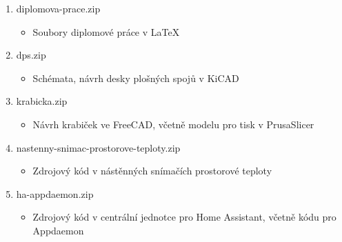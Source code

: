 \begin{enumerate}
  \item diplomova-prace.zip
  \begin{itemize}
     	\item Soubory diplomové práce v \LaTeX
  	\end{itemize}
  \item dps.zip 
  	\begin{itemize}
     	\item Schémata, návrh desky plošných spojů v KiCAD
  	\end{itemize}
  \item krabicka.zip
  	\begin{itemize}
     	\item Návrh krabiček ve FreeCAD, včetně modelu pro tisk v PrusaSlicer 
   	\end{itemize}
   \item nastenny-snimac-prostorove-teploty.zip
  		\begin{itemize}
     		\item Zdrojový kód v nástěnných snímačích prostorové teploty
   		\end{itemize}
   	\item ha-appdaemon.zip
  		\begin{itemize}
     		\item Zdrojový kód v centrální jednotce pro Home Assistant, včetně kódu pro Appdaemon
   		\end{itemize}
\end{enumerate}